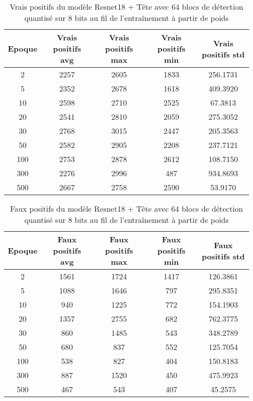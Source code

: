 \begin{table}[!ht]
    \caption{Vrais positifs du modèle Resnet18 + Tête avec 64 blocs de détection quantisé sur 8 bits au fil de l'entraînement à partir de poids}
    \label{tab:qresnet18+head_64n_true_positive_8b_from_weights}
    \centering
    \begin{tabular}{ |c||c|c|c|c|  }
        \hline
        \rowcolor{gray!50}
        Epoque & Vrais positifs avg & Vrais positifs max & Vrais positifs min & Vrais positifs std\\
        \hline
        2 & 2257 & 2605 & 1833 & 256.1731\\
        5 & 2352 & 2678 & 1618 & 409.3920\\
        10 & 2598 & 2710 & 2525 & 67.3813\\
        20 & 2541 & 2810 & 2059 & 275.3052\\
        30 & 2768 & 3015 & 2447 & 205.3563\\
        50 & 2582 & 2905 & 2208 & 237.7121\\
        100 & 2753 & 2878 & 2612 & 108.7150\\
        300 & 2276 & 2996 & 487 & 934.8693\\
        500 & 2667 & 2758 & 2590 & 53.9170\\
        \hline
    \end{tabular}
\end{table}

\begin{table}[!ht]
    \caption{Faux positifs du modèle Resnet18 + Tête avec 64 blocs de détection quantisé sur 8 bits au fil de l'entraînement à partir de poids}
    \label{tab:qresnet18+head_64n_false_positive_8b_from_weights}
    \centering
    \begin{tabular}{ |c||c|c|c|c|  }
        \hline
        \rowcolor{gray!50}
        Epoque & Faux positifs avg & Faux positifs max & Faux positifs min & Faux positifs std\\
        \hline
        2 & 1561 & 1724 & 1417 & 126.3861\\
        5 & 1088 & 1646 & 797 & 295.8351\\
        10 & 940 & 1225 & 772 & 154.1903\\
        20 & 1357 & 2755 & 682 & 762.3775\\
        30 & 860 & 1485 & 543 & 348.2789\\
        50 & 680 & 837 & 552 & 125.7054\\
        100 & 538 & 827 & 404 & 150.8183\\
        300 & 887 & 1520 & 450 & 475.9923\\
        500 & 467 & 543 & 407 & 45.2575\\
        \hline
    \end{tabular}
\end{table}

